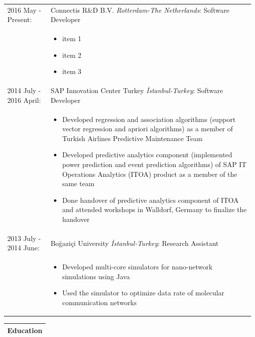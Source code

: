\documentclass[11pt]{article}
\newcommand{\bigspace}{\vspace{0.4cm}}
\begin{document}
\begin{tabular}{p{5.5cm} p{12.5cm}}
\\
2016 May - Present:          & Connectis R\&D B.V. \textit{Rotterdam-The Netherlands}: Software Developer \\
							 & 
\begin{itemize}
\setlength\itemsep{0em}
\vspace{-15pt}
\item item 1
\item item 2
\item item 3
\vspace{-10pt}
\end{itemize}\\
2014 July - 2016 April:      & SAP Innovation Center Turkey \textit{\.{I}stanbul-Turkey}: Software Developer \\
							 & 
\begin{itemize}
\setlength\itemsep{0em}
\vspace{-15pt}
\item Developed regression and association algorithms (support vector regression and apriori algorithms) as a member of Turkish Airlines Predictive Maintenance Team
\item Developed predictive analytics component (implemented power prediction and event prediction algorithms) of SAP IT Operations Analytics (ITOA) product as a member of the same team
\item Done handover of predictive analytics component of ITOA and attended workshops in Walldorf, Germany to finalize the handover
\vspace{-10pt}
\end{itemize}\\
2013 July - 2014 June:       & Bo\u{g}azi\c{c}i University \textit{\.{I}stanbul-Turkey}: Research Assistant \\
							 &
\begin{itemize}
\setlength\itemsep{0em}
\vspace{-15pt}
\item Developed multi-core simulators for nano-network simulations using Java
\item Used the simulator to optimize data rate of molecular communication networks
\vspace{-10pt}
\end{itemize}\\
\end{tabular}

\bigspace
\begin{tabular}{p{18cm}}
\textbf{Education} \\
\hline
\end{tabular}
\end{document}
